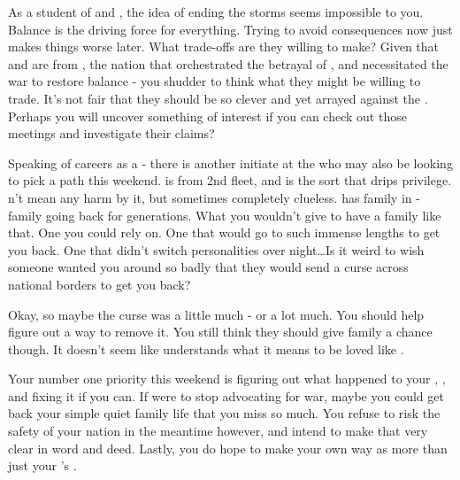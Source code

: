 \documentclass[char]{GL2020}
\begin{document}
As a student of \cEbb{} and \cFlow{}, the idea of ending the storms seems impossible to you. Balance is the driving force for everything. Trying to avoid consequences now just makes things worse later. What trade-offs are they willing to make? Given that \cHeadScientist{} and \cAssistantScientist{} are from \pTech{}, the nation that orchestrated the betrayal of \pShip{}, and necessitated the war to restore balance - you shudder to think what they might be willing to trade. It’s not fair that they should be so clever and yet arrayed against the \pShip{}. Perhaps you will uncover something of interest if you can check out those meetings and investigate their claims?

Speaking of careers as a \cWarlordDaughter{\cleric} - there is another initiate at the \pSchool{} who may also be looking to pick a path this weekend. \cInitiate{} is from 2nd fleet, and is the sort that drips privilege. \cInitiate{\They} \cInitiate{\does}n't mean any harm by it, but sometimes \cInitiate{\they} \cInitiate{\are} completely clueless. \cInitiate{} has family in \pFarm{} - family going back for generations. What you wouldn’t give to have a family like that. One you could rely on. One that would go to such immense lengths to get you back. One that didn’t switch personalities over night\ldots Is it weird to wish someone wanted you around so badly that they would send a curse across national borders to get you back?

Okay, so maybe the curse was a little much - or a lot much. You should help \cInitiate{} figure out a way to remove it. You still think they should give \cInitiate{\their} family a chance though. It doesn’t seem like \cInitiate{} understands what it means to be loved like \cInitiate{\they} \cInitiate{\are}.

Your number one priority this weekend is figuring out what happened to your \cLoud{\parent}, \cLoud{}, and fixing it if you can. If \cLoud{\they} were to stop advocating for war, maybe you could get back your simple quiet family life that you miss so much. You refuse to risk the safety of your nation in the meantime however, and intend to make that very clear in word and deed. Lastly, you do hope to make your own way as more than just your \cLoud{\parent}’s \cWarlordDaughter{\child}.
\end{document}
